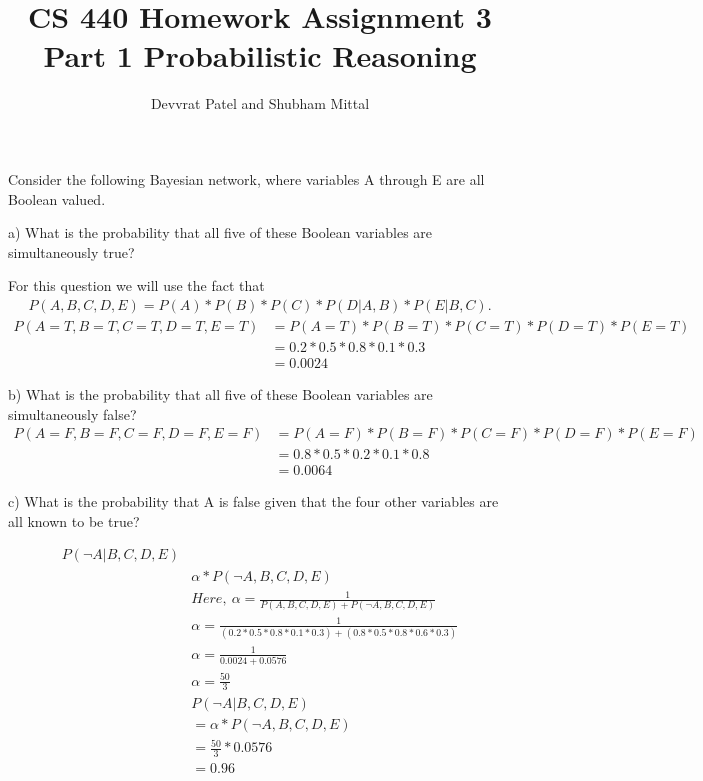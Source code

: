 \documentclass[12pt]{article}
\newenvironment{problem}[2][Problem]{\begin{trivlist}
\item[\hskip \labelsep {\bfseries #1}\hskip \labelsep {\bfseries #2.}]}{\end{trivlist}}
\begin{document}
\title{CS 440 Homework Assignment 3 Part 1 \newline
Probabilistic Reasoning}
\author{Devvrat Patel and Shubham Mittal}
\maketitle
\begin{problem}{1} : Consider the following Bayesian network, where variables A through E are all Boolean valued.

    a) What is the probability that all five of these Boolean variables are       simultaneously true?
    
    For this question we will use the fact that 
    \begin{align*}
    P(A,B,C,D,E) = P(A) * P(B) * P(C) * P(D | A,B) * P(E | B,C).
    \end{align*}
    \begin{align*}
    P(A=T,B=T,C=T,D=T,E=T)
    & = P(A=T)*P(B=T)*P(C=T)*P(D=T)*P(E=T) \\
    & = 0.2 * 0.5 * 0.8 * 0.1 * 0.3 \\
    & = 0.0024
    \end{align*}
    
    
    
    b) What is the probability that all five of these Boolean variables are       simultaneously false?
\begin{align*}
    P(A=F,B=F,C=F,D=F,E=F)
    & = P(A=F)*P(B=F)*P(C=F)*P(D=F)*P(E=F) \\
    & = 0.8 * 0.5 * 0.2 * 0.1 * 0.8 \\
    & = 0.0064
    \end{align*}
    \newpage
    
    c) What is the probability that A is false given that the four other          variables are all known to be true?
    
    \begin{align*}
        P(\neg A| B,C,D,E) \\
        & \alpha * P(\neg A,B,C,D,E)\\
        & Here, \ \alpha =  \frac{1}{P(A,B,C,D,E)+P(\neg A,B,C,D,E)} \\
        & \alpha = \frac{1}{(0.2 * 0.5 * 0.8 * 0.1 * 0.3)+(0.8 * 0.5 * 0.8 * 0.6 * 0.3)} \\
        & \alpha = \frac{1}{0.0024+0.0576}\\
        & \alpha = \frac{50}{3}\\
        & P(\neg A| B,C,D,E) \\
        & = \alpha * P(\neg A,B,C,D,E)\\
        & = \frac{50}{3} * 0.0576\\
        & = 0.96
        \end{align*}

\end{problem}
\newpage
\end{document}
